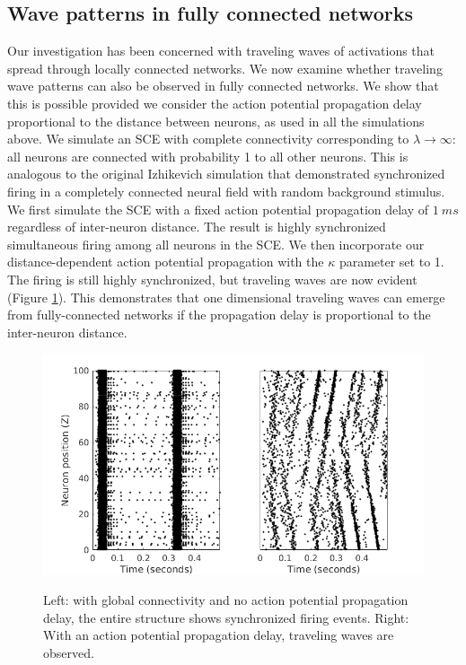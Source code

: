 \documentclass[12pt]{article}
\begin{document}
\FloatBarrier

\subsection{Wave patterns in fully connected networks} \label{sub:delay}
Our investigation has been concerned with traveling waves of activations that spread through locally connected networks.
We now examine whether traveling wave patterns can also be observed in fully connected networks.
We show that this is possible provided we consider the action potential propagation delay proportional to the distance between neurons, as used in all the simulations above.
We simulate an SCE with complete connectivity corresponding to $\lambda \rightarrow \infty$: all neurons are connected with probability 1 to all other neurons.
This is analogous to the original Izhikevich simulation that demonstrated synchronized firing in a completely connected neural field with random background stimulus.
We first simulate the SCE with a fixed action potential propagation delay of $1~ms$ regardless of inter-neuron distance.
The result is highly synchronized simultaneous firing among all neurons in the SCE.
We then incorporate our distance-dependent action potential propagation with the $\kappa$ parameter set to 1.
The firing is still highly synchronized, but traveling waves are now evident (Figure \ref{fig:delay_waves}).
This demonstrates that one dimensional traveling waves can emerge from fully-connected networks if the propagation delay is proportional to the inter-neuron distance.
\begin{figure}[!htb]
 \caption{Left: with global connectivity and no action potential propagation delay, the entire structure shows synchronized firing events. Right: With an action potential propagation delay, traveling waves are observed.}
 \centering
   \includegraphics[width=\textwidth]{fig/DelayWaves}  
 \label{fig:delay_waves}
\end{figure}
\end{document}
